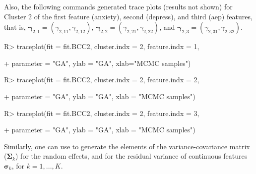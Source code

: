 Also, the following commands generated trace plots (results not shown) for Cluster 2 of the first feature (anxiety), second (depress), and third (aep) features, that is,  $\boldsymbol{\gamma}_{2,1} = (\gamma_{2,11}, \gamma_{2,12})$,  $\boldsymbol{\gamma}_{2,2} = (\gamma_{2,21}, \gamma_{2,22})$, and $\boldsymbol{\gamma}_{2,3} = (\gamma_{2,31}, \gamma_{2,32})$. 

\begin{example}

R> traceplot(fit = fit.BCC2, cluster.indx = 2, feature.indx = 1,

+        parameter = "GA", ylab = "GA", xlab="MCMC samples")

R> traceplot(fit = fit.BCC2, cluster.indx = 2, feature.indx = 2,

+        parameter = "GA", ylab = "GA", xlab = "MCMC samples")

R> traceplot(fit = fit.BCC2, cluster.indx = 2, feature.indx = 3,

+        parameter = "GA", ylab = "GA", xlab = "MCMC samples")

\end{example} 




Similarly, one can use  to generate the elements of the variance-covariance matrix ($\boldsymbol{\Sigma}_k$) for the random effects, and    for the residual variance of continuous features $\boldsymbol{\sigma}_k$, for $k=1,...,K$. 

